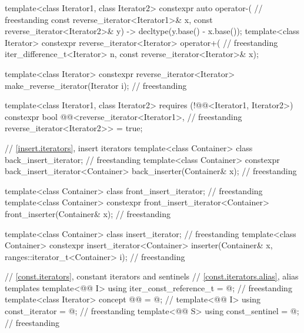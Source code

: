 \begin{codeblock}
{  template<class Iterator1, class Iterator2>
    constexpr auto operator-(                                                       // freestanding
      const reverse_iterator<Iterator1>& x,
      const reverse_iterator<Iterator2>& y) -> decltype(y.base() - x.base());
  template<class Iterator>
    constexpr reverse_iterator<Iterator> operator+(                                 // freestanding
      iter_difference_t<Iterator> n,
      const reverse_iterator<Iterator>& x);

  template<class Iterator>
    constexpr reverse_iterator<Iterator> make_reverse_iterator(Iterator i);         // freestanding

  template<class Iterator1, class Iterator2>
    requires (!@@<Iterator1, Iterator2>)
    constexpr bool @@<reverse_iterator<Iterator1>,          // freestanding
                                              reverse_iterator<Iterator2>> = true;

  // \ref{insert.iterators}, insert iterators
  template<class Container> class back_insert_iterator;                             // freestanding
  template<class Container>
    constexpr back_insert_iterator<Container> back_inserter(Container& x);          // freestanding

  template<class Container> class front_insert_iterator;                            // freestanding
  template<class Container>
    constexpr front_insert_iterator<Container> front_inserter(Container& x);        // freestanding

  template<class Container> class insert_iterator;                                  // freestanding
  template<class Container>
    constexpr insert_iterator<Container>
      inserter(Container& x, ranges::iterator_t<Container> i);                      // freestanding

  // \ref{const.iterators}, constant iterators and sentinels
  // \ref{const.iterators.alias}, alias templates
  template<@@ I>
    using iter_const_reference_t = @\seebelow@;                                       // freestanding
  template<class Iterator>
    concept @@ = @\seebelow@; // \expos
  template<@@ I>
    using const_iterator = @\seebelow@;                                               // freestanding
  template<@@ S>
    using const_sentinel = @\seebelow@;                                               // freestanding

}
\end{codeblock}
